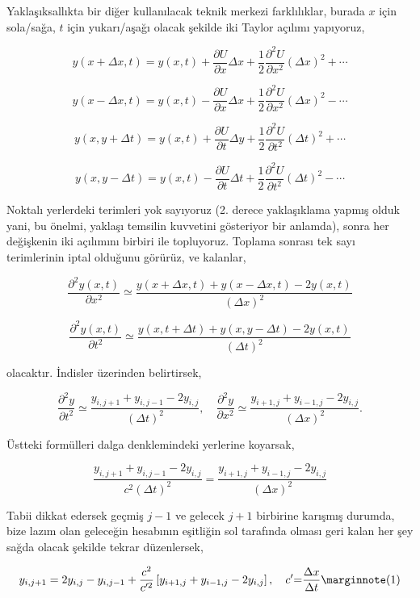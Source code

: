 \documentclass[12pt,fleqn]{article}\usepackage{../../common}
\begin{document}
Yaklaşıksallıkta bir diğer kullanılacak teknik merkezi farklılıklar, burada $x$
için sola/sağa, $t$ için yukarı/aşağı olacak şekilde iki Taylor açılımı
yapıyoruz,


$$
y(x +\Delta x, t)  = y(x,t) +
\frac{\partial U}{\partial x}\Delta x + \frac{1}{2}
\frac{\partial^2 U}{\partial x^2}(\Delta x)^2 + \cdots
$$

$$
y(x -\Delta x, t)  = y(x,t) -
\frac{\partial U}{\partial x} \Delta x + \frac{1} {2}
\frac{\partial^2 U}{\partial x^2} (\Delta x)^2 - \cdots
$$

$$
y(x, y +\Delta t)  = y(x,t) +
\frac{\partial U}{\partial t}\Delta y + \frac{1}{2}
\frac{\partial^2 U}{\partial t^2}(\Delta t)^2 + \cdots
$$

$$
y(x, y -\Delta t) = y(x,t) -
\frac{\partial U}{\partial t} \Delta t + \frac{1} {2}
\frac{\partial^2 U}{\partial t^2} (\Delta t)^2 - \cdots
$$

Noktalı yerlerdeki terimleri yok sayıyoruz (2. derece yaklaşıklama yapmış olduk
yani, bu önelmi, yaklaşı temsilin kuvvetini gösteriyor bir anlamda), sonra her
değişkenin iki açılımını birbiri ile topluyoruz. Toplama sonrası tek sayı
terimlerinin iptal olduğunu görürüz, ve kalanlar,

$$
\frac{\partial^2 y(x,t)}{\partial x^2} \simeq
\frac{y(x+\Delta x,t)+y(x-\Delta x,t)-2 y(x,t)}{(\Delta x)^2}
$$

$$
\frac{\partial^2 y(x,t)}{\partial t^2} \simeq
\frac{y(x,t+\Delta t) +y(x, y-\Delta t)-2 y(x,t)}{(\Delta t)^2}
$$

olacaktır. İndisler üzerinden belirtirsek,

$$
\frac{\partial^2 y }{\partial t^2} \simeq
\frac{y_{i,j+1}+y_{i,j-1}-2 y_{i,j}}{(\Delta t)^2}, \quad
\frac{\partial^2 y}{\partial x^2} \simeq
\frac{y_{i+1,j}+y_{i-1,j}-2 y_{i,j}} {(\Delta x)^2}.
$$

Üstteki formülleri dalga denklemindeki yerlerine koyarsak,

$$
\frac{y_{i,j+1}+y_{i,j-1}-2 y_{i,j}} {c^2 (\Delta t)^2}  =
\frac{y_{i+1,j}+y_{i-1,j}-2 y_{i,j}} {(\Delta x)^2}
$$

Tabii dikkat edersek geçmiş $j-1$ ve gelecek $j+1$ birbirine karışmış durumda,
bize lazım olan geleceğin hesabının eşitliğin sol tarafında olması geri kalan
her şey sağda olacak şekilde tekrar düzenlersek,

$$
y_{i,j+1}  = 2 y_{i,j}-y_{i,j-1}+ \frac{c^2 } {c'^{2}}
\left [ y_{i+1,j}+y_{i-1,j}-2 y_{i,j}\right], \quad c' { = }
\frac {\Delta x}{\Delta t}
\mlabel{1}
$$
\end{document}
